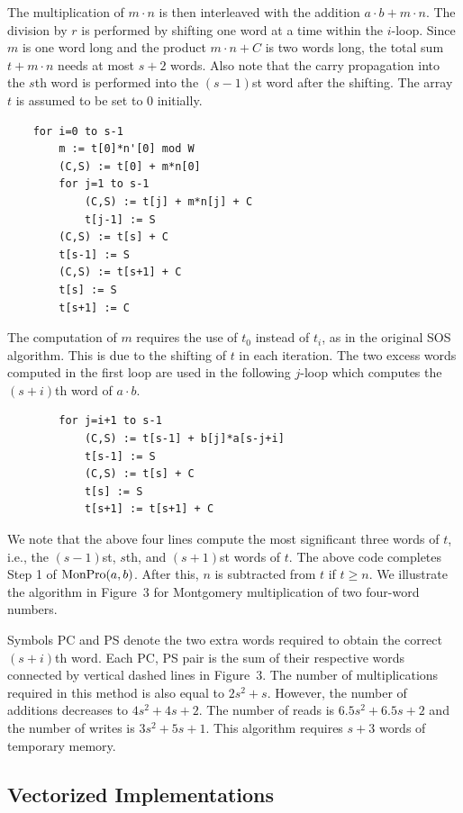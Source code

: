 \documentclass[twocolumn]{svjour3}          %
\begin{document}
\noindent
The multiplication of $m\cdot n$ is then interleaved with
the addition $a \cdot b + m \cdot n$. The division by $r$ is performed
by shifting one word at a time within the $i$-loop.
Since $m$ is one word long and the product $m\cdot n+C$ is two words long,
the total sum $t + m\cdot n$ needs at most $s+2$ words.
Also note that the carry propagation into the $s$th word is performed into
the $(s-1)$st word after the shifting. The array $t$ is assumed
to be set to 0 initially.
%
\begin{verbatim}
    for i=0 to s-1
        m := t[0]*n'[0] mod W
        (C,S) := t[0] + m*n[0]
        for j=1 to s-1
            (C,S) := t[j] + m*n[j] + C
            t[j-1] := S
        (C,S) := t[s] + C
        t[s-1] := S
        (C,S) := t[s+1] + C
        t[s] := S
        t[s+1] := C
\end{verbatim}
%
The computation of $m$ requires the use of $t_0$ instead
of $t_i$, as in the original SOS algorithm.
This is due to the shifting of $t$ in each iteration.
The two excess words computed in the first loop are used in the
following $j$-loop which computes the $(s+i)$th word of
$a\cdot b$.
%
\begin{verbatim}
        for j=i+1 to s-1
            (C,S) := t[s-1] + b[j]*a[s-j+i]
            t[s-1] := S
            (C,S) := t[s] + C
            t[s] := S
            t[s+1] := t[s+1] + C
\end{verbatim}
%
We note that the above four lines compute the most significant three words of
$t$, i.e., the $(s-1)$st, $s$th, and $(s+1)$st words of $t$. The
above code completes Step 1 of $\mbox{MonPro}(a,b)$. After this, $n$ is
subtracted from $t$ if $t\geq n$. We illustrate the algorithm in
Figure~3 for Montgomery multiplication of two four-word numbers.

Symbols PC and PS denote the two extra words
required to obtain the correct $(s+i)$th word.
Each PC, PS pair is the sum of their respective words connected by
vertical dashed lines in Figure~3.
The number of multiplications required in this method is also equal to
$2s^2+s$. However, the number of additions decreases to $4s^2+4s+2$.
The number of reads is $6.5s^2+6.5s+2$ and the number of
writes is $3s^2+5s+1$.
This algorithm requires $s+3$ words of temporary memory.

\subsection{Vectorized Implementations}
\label{vectorized}
\end{document}
